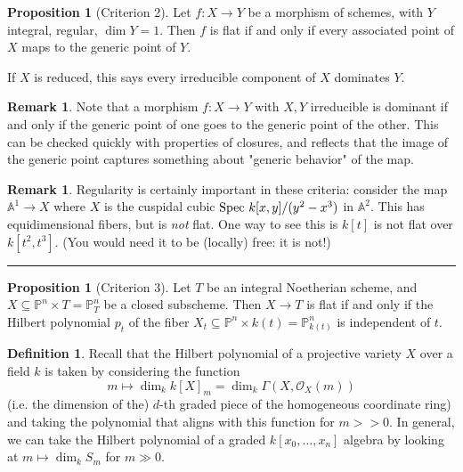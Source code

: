 \documentclass[10pt,reqno]{amsart}
\theoremstyle{definition}
\newtheorem{definition}[theorem]{Definition}
\newtheorem{proposition}[theorem]{Proposition}
\newtheorem{remark}[theorem]{Remark}
\theoremstyle{remark}
\numberwithin{equation}{section}
\numberwithin{theorem}{section}
\newcommand{\OO}{{\mathcal O}}
\newcommand{\spec}{\textup{Spec }}
\newcommand{\PP}{{\mathbb P}}
\begin{document}
\begin{proposition}[Criterion 2] Let $f: X \to Y$ be a morphism of schemes, with $Y$ integral, regular, $\dim Y = 1$. Then $f$ is flat if and only if every associated point of $X$ maps to the generic point of $Y$. 

If $X$ is reduced, this says every irreducible component of $X$ dominates $Y$.
\end{proposition}

\begin{remark} Note that a morphism $f:X \to Y$ with $X,Y$ irreducible is dominant if and only if the generic point of one goes to the generic point of the other. This can be checked quickly with properties of closures, and reflects that the image of the generic point captures something about "generic behavior" of the map. %
\end{remark}

\begin{remark} Regularity is certainly important in these criteria: consider the map $\mathbb{A}^1 \to X$ where $X$ is the cuspidal cubic $\spec k[x,y]/(y^2-x^3)$ in $\mathbb{A}^2$. This has equidimensional fibers, but is \textit{not} flat.  One way to see this is $k[t]$ is not flat over $k[t^2,t^3]$. (You would need it to be (locally) free: it is not!)
\end{remark}

\hrule
\vspace{1em}

\begin{proposition}[Criterion 3] Let $T$ be an integral Noetherian scheme, and $X \subseteq \PP^n \times T = \PP^n_T$ be a closed subscheme. Then $X \to T$ is flat if and only if the Hilbert polynomial $p_t$ of the fiber $X_t \subseteq \PP^n \times k(t) = \PP^n_{k(t)}$ is independent of $t$.
\end{proposition}

\begin{definition} Recall that the Hilbert polynomial of a projective variety $X$ over a field $k$ is taken by considering the function
\[m \mapsto \dim_k k[X]_m = \dim_k \Gamma(X,\OO_X(m))\]
(i.e. the dimension of the) $d$-th graded piece of the homogeneous coordinate ring) and taking the polynomial that aligns with this function for $m >> 0$. In general, we can take the Hilbert polynomial of a graded $ k[x_0,\dots,x_n]$ algebra by looking at $m \mapsto \dim_k S_{m}$ for $m \gg 0$.
\end{definition}
\end{document}
